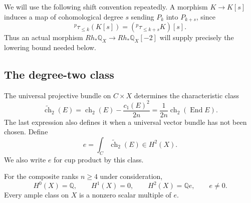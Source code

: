 We will use the following shift convention repeatedly.  A morphism
$K\to K[s]$ induces a map of cohomological degree $s$ sending $P_k$ into
$P_{k+s}$, since
\begin{equation}\label{norm:shift-rule}
 {}^p\tau_{\le k}(K[s])
 =({}^p\tau_{\le k+s}K)[s].
\end{equation}
Thus an actual morphism $Rh_*\mathbb Q_X\to Rh_*\mathbb Q_X[-2]$
will supply precisely the lowering bound needed below.

\subsection{The degree-two class}

The universal projective bundle on $C\times X$ determines the characteristic class
\[
 \widetilde{\operatorname{ch}}_2(E)
 =\operatorname{ch}_2(E)-\frac{c_1(E)^2}{2n}
 =\frac{1}{2n}\operatorname{ch}_2(\operatorname{End}E).
\]
The last expression also defines it when a universal vector bundle has
not been chosen.  Define
\begin{equation}\label{norm:e}
 e=\int_C\widetilde{\operatorname{ch}}_2(E)\in H^2(X).
\end{equation}
We also write $e$ for cup product by this class.

\begin{lemma}\label{norm:low-cohomology}
For the composite ranks $n\ge4$ under consideration,
\[
 H^0(X)=\mathbb Q,\qquad H^1(X)=0,\qquad H^2(X)=\mathbb Q e,
 \qquad e\ne0.
\]
Every ample class on $X$ is a nonzero scalar multiple of $e$.
\end{lemma}

